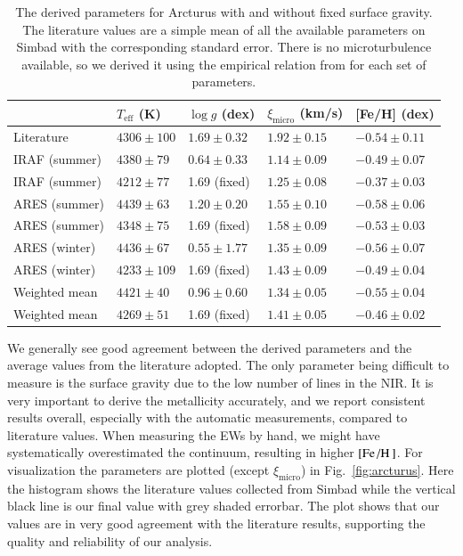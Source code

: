 \documentclass{aa}
\begin{document}
\begin{table}[htb!]
    \caption{The derived parameters for Arcturus with and without fixed surface
             gravity. The literature values are a simple mean of all the
             available parameters on Simbad with the corresponding standard
             error. There is no microturbulence available, so we derived it
             using the empirical relation from \citet{Adibekyan2015} for each
             set of parameters.}
    \label{tab:arcturus}
    \centering
    \begin{tabular}{lllll}
      \hline\hline
                      & $T_\mathrm{eff}$ (K) &  $\log g$ (dex)  &   $\xi_\mathrm{micro}$ (km/s)   & [Fe/H] (dex)     \\
      \hline
        Literature    & $4306 \pm 100$       &  $1.69 \pm 0.32$ &    $1.92 \pm 0.15$              & $-0.54 \pm 0.11$ \\
      \hline
        IRAF (summer) & $4380 \pm  79$       &  $0.64 \pm 0.33$ &    $1.14 \pm 0.09$              & $-0.49 \pm 0.07$ \\
        IRAF (summer) & $4212 \pm  77$       &   1.69 (fixed)   &    $1.25 \pm 0.08$              & $-0.37 \pm 0.03$ \\
      \hline
        ARES (summer) & $4439 \pm  63$       &  $1.20 \pm 0.20$ &    $1.55 \pm 0.10$              & $-0.58 \pm 0.06$ \\
        ARES (summer) & $4348 \pm  75$       &   1.69 (fixed)   &    $1.58 \pm 0.09$              & $-0.53 \pm 0.03$ \\
        ARES (winter) & $4436 \pm  67$       &  $0.55 \pm 1.77$ &    $1.35 \pm 0.09$              & $-0.56 \pm 0.07$ \\
        ARES (winter) & $4233 \pm 109$       &   1.69 (fixed)   &    $1.43 \pm 0.09$              & $-0.49 \pm 0.04$ \\
      \hline
        Weighted mean & $4421 \pm  40$       &  $0.96 \pm 0.60$ &    $1.34 \pm 0.05$              & $-0.55 \pm 0.04$ \\
        Weighted mean & $4269 \pm  51$       &   1.69 (fixed)   &    $1.41 \pm 0.05$              & $-0.46 \pm 0.02$ \\
      \hline
    \end{tabular}
\end{table}

We generally see good agreement between the derived parameters and the average
values from the literature adopted. The only parameter being difficult to
measure is the surface gravity due to the low number of  lines in
the NIR. It is very important to derive the metallicity accurately, and we
report consistent results overall, especially with the automatic measurements,
compared to literature values. When measuring the EWs by hand, we might have
systematically overestimated the continuum, resulting in higher
$[\ion{Fe}/\ion{H}]$. For visualization the parameters are plotted (except
$\xi_\mathrm{micro}$) in Fig.~\ref{fig:arcturus}. Here the histogram shows the
literature values collected from Simbad while the vertical black line is our
final value with grey shaded errorbar. The plot shows that our values are in
very good agreement with the literature results, supporting the quality and
reliability of our analysis.
\end{document}
